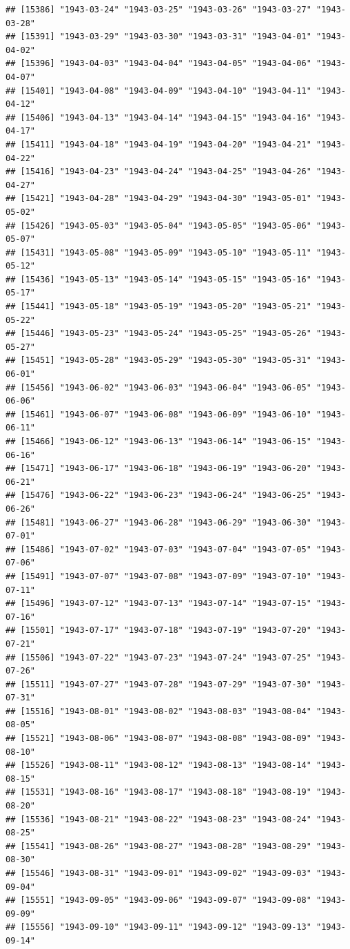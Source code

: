 \documentclass{article}\usepackage[]{graphicx}\usepackage[]{color}
\makeatletter
\newenvironment{kframe}{%
 \def\at@end@of@kframe{}%
 \ifinner\ifhmode%
  \def\at@end@of@kframe{\end{minipage}}%
  \begin{minipage}{\columnwidth}%
 \fi\fi%
 \def\FrameCommand##1{\hskip\@totalleftmargin \hskip-\fboxsep
 \colorbox{shadecolor}{##1}\hskip-\fboxsep
     \hskip-\linewidth \hskip-\@totalleftmargin \hskip\columnwidth}%
 \MakeFramed {\advance\hsize-\width
   \@totalleftmargin\z@ \linewidth\hsize
   \@setminipage}}%
 {\par\unskip\endMakeFramed%
 \at@end@of@kframe}
\newenvironment{knitrout}{}{} %
\makeatother
\begin{document}
\begin{description}
\begin{knitrout}
\begin{kframe}
\begin{verbatim}
## [15386] "1943-03-24" "1943-03-25" "1943-03-26" "1943-03-27" "1943-03-28"
## [15391] "1943-03-29" "1943-03-30" "1943-03-31" "1943-04-01" "1943-04-02"
## [15396] "1943-04-03" "1943-04-04" "1943-04-05" "1943-04-06" "1943-04-07"
## [15401] "1943-04-08" "1943-04-09" "1943-04-10" "1943-04-11" "1943-04-12"
## [15406] "1943-04-13" "1943-04-14" "1943-04-15" "1943-04-16" "1943-04-17"
## [15411] "1943-04-18" "1943-04-19" "1943-04-20" "1943-04-21" "1943-04-22"
## [15416] "1943-04-23" "1943-04-24" "1943-04-25" "1943-04-26" "1943-04-27"
## [15421] "1943-04-28" "1943-04-29" "1943-04-30" "1943-05-01" "1943-05-02"
## [15426] "1943-05-03" "1943-05-04" "1943-05-05" "1943-05-06" "1943-05-07"
## [15431] "1943-05-08" "1943-05-09" "1943-05-10" "1943-05-11" "1943-05-12"
## [15436] "1943-05-13" "1943-05-14" "1943-05-15" "1943-05-16" "1943-05-17"
## [15441] "1943-05-18" "1943-05-19" "1943-05-20" "1943-05-21" "1943-05-22"
## [15446] "1943-05-23" "1943-05-24" "1943-05-25" "1943-05-26" "1943-05-27"
## [15451] "1943-05-28" "1943-05-29" "1943-05-30" "1943-05-31" "1943-06-01"
## [15456] "1943-06-02" "1943-06-03" "1943-06-04" "1943-06-05" "1943-06-06"
## [15461] "1943-06-07" "1943-06-08" "1943-06-09" "1943-06-10" "1943-06-11"
## [15466] "1943-06-12" "1943-06-13" "1943-06-14" "1943-06-15" "1943-06-16"
## [15471] "1943-06-17" "1943-06-18" "1943-06-19" "1943-06-20" "1943-06-21"
## [15476] "1943-06-22" "1943-06-23" "1943-06-24" "1943-06-25" "1943-06-26"
## [15481] "1943-06-27" "1943-06-28" "1943-06-29" "1943-06-30" "1943-07-01"
## [15486] "1943-07-02" "1943-07-03" "1943-07-04" "1943-07-05" "1943-07-06"
## [15491] "1943-07-07" "1943-07-08" "1943-07-09" "1943-07-10" "1943-07-11"
## [15496] "1943-07-12" "1943-07-13" "1943-07-14" "1943-07-15" "1943-07-16"
## [15501] "1943-07-17" "1943-07-18" "1943-07-19" "1943-07-20" "1943-07-21"
## [15506] "1943-07-22" "1943-07-23" "1943-07-24" "1943-07-25" "1943-07-26"
## [15511] "1943-07-27" "1943-07-28" "1943-07-29" "1943-07-30" "1943-07-31"
## [15516] "1943-08-01" "1943-08-02" "1943-08-03" "1943-08-04" "1943-08-05"
## [15521] "1943-08-06" "1943-08-07" "1943-08-08" "1943-08-09" "1943-08-10"
## [15526] "1943-08-11" "1943-08-12" "1943-08-13" "1943-08-14" "1943-08-15"
## [15531] "1943-08-16" "1943-08-17" "1943-08-18" "1943-08-19" "1943-08-20"
## [15536] "1943-08-21" "1943-08-22" "1943-08-23" "1943-08-24" "1943-08-25"
## [15541] "1943-08-26" "1943-08-27" "1943-08-28" "1943-08-29" "1943-08-30"
## [15546] "1943-08-31" "1943-09-01" "1943-09-02" "1943-09-03" "1943-09-04"
## [15551] "1943-09-05" "1943-09-06" "1943-09-07" "1943-09-08" "1943-09-09"
## [15556] "1943-09-10" "1943-09-11" "1943-09-12" "1943-09-13" "1943-09-14"

\end{verbatim}
\end{kframe}
\end{knitrout}
\end{description}
\end{document}
